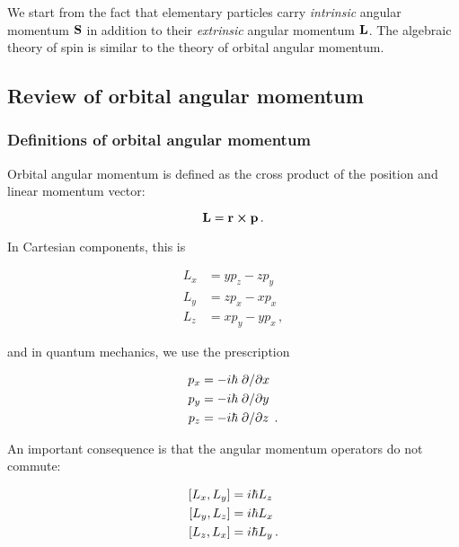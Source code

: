 \documentclass[12pt, titlepage]{article}
\begin{document}
We start from the fact that elementary particles carry \emph{intrinsic} angular momentum $\vb{S}$ in addition to their \emph{extrinsic} angular momentum $\vb{L}$. The algebraic theory of spin is similar to the theory of orbital angular momentum.

\subsection{Review of orbital angular momentum}
\subsubsection{Definitions of orbital angular momentum}
Orbital angular momentum is defined as the cross product of the position and linear momentum vector:

\begin{equation}
\vb{L} = \vb{r}\cross\vb{p} \, .
\end{equation}


In Cartesian components, this is

\begin{subequations}
	\begin{align}
	L_{x} &= y p_{z} - z p_{y} \\
	L_{y} &= z p_{x} - x p_{x} \\
	L_{z} &= x p_{y} - y p_{x} \, ,
	\end{align}
\end{subequations}

and in quantum mechanics, we use the prescription

\begin{subequations}
	\begin{align}
	p_{x} &= - i \hbar \pdv*{x} \\
	p_{y} &= - i \hbar \pdv*{y} \\
	p_{z} &= - i \hbar \pdv*{z} \, .
	\end{align}
\end{subequations}

An important consequence is that the angular momentum operators do not commute:

\begin{subequations}
	\begin{align}
	\comm{L_{x}}{L_{y}} &= i \hbar L_{z} \\
	\comm{L_{y}}{L_{z}} &= i \hbar L_{x} \\
	\comm{L_{z}}{L_{x}} &= i \hbar L_{y} \, .
	\end{align}
\end{subequations}
\end{document}
